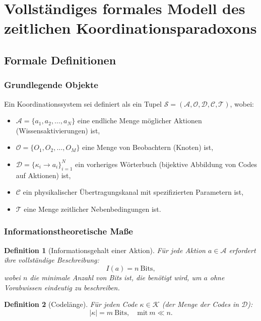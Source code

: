 \documentclass[12pt]{article}
\newtheorem{definition}{Definition}
\begin{document}
	\section{Vollständiges formales Modell des zeitlichen Koordinationsparadoxons}
	\label{app:formal-model}
	
	\subsection{Formale Definitionen}
	\label{app:definitions}
	
	\subsubsection{Grundlegende Objekte}
	
	Ein Koordinationssystem sei definiert als ein Tupel $\mathcal{S} = (\mathcal{A}, \mathcal{O}, \mathcal{D}, \mathcal{C}, \mathcal{T})$, wobei:
	
	\begin{itemize}
		\item $\mathcal{A} = \{a_1, a_2, \dots, a_N\}$ eine endliche Menge möglicher Aktionen (Wissensaktivierungen) ist,
		\item $\mathcal{O} = \{O_1, O_2, \dots, O_M\}$ eine Menge von Beobachtern (Knoten) ist,
		\item $\mathcal{D} = \{\kappa_i \to a_i\}_{i=1}^N$ ein vorheriges Wörterbuch (bijektive Abbildung von Codes auf Aktionen) ist,
		\item $\mathcal{C}$ ein physikalischer Übertragungskanal mit spezifizierten Parametern ist,
		\item $\mathcal{T}$ eine Menge zeitlicher Nebenbedingungen ist.
	\end{itemize}
	
	\subsubsection{Informationstheoretische Maße}
	
	\begin{definition}[Informationsgehalt einer Aktion]
		Für jede Aktion $a \in \mathcal{A}$ erfordert ihre vollständige Beschreibung:
		\[
		I(a) = n \ \text{Bits},
		\]
		wobei $n$ die minimale Anzahl von Bits ist, die benötigt wird, um $a$ ohne Vorabwissen eindeutig zu beschreiben.
	\end{definition}
	
	\begin{definition}[Codelänge]
		Für jeden Code $\kappa \in \mathcal{K}$ (der Menge der Codes in $\mathcal{D}$):
		\[
		|\kappa| = m \ \text{Bits}, \quad \text{mit} \ m \ll n.
		\]
	\end{definition}
	
\end{document}
